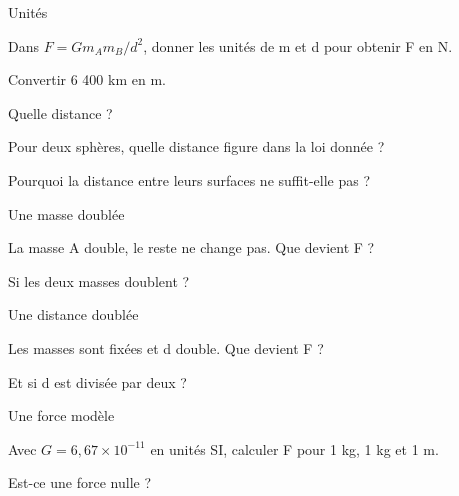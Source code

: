 \par\noindent\begin{minipage}{\linewidth}
\begin{exercice}[1]{Unités}
\begin{questions}
\item Dans $F=Gm_A m_B/d^2$, donner les unités de m et d pour obtenir F en N.
\item Convertir 6 400 km en m.
\end{questions}
\end{exercice}
\end{minipage}
\par\noindent\begin{minipage}{\linewidth}
\begin{exercice}[1]{Quelle distance ?}
\begin{questions}
\item Pour deux sphères, quelle distance figure dans la loi donnée ?
\item Pourquoi la distance entre leurs surfaces ne suffit-elle pas ?
\end{questions}
\end{exercice}
\end{minipage}
\par\noindent\begin{minipage}{\linewidth}
\begin{exercice}[1]{Une masse doublée}
\begin{questions}
\item La masse A double, le reste ne change pas. Que devient F ?
\item Si les deux masses doublent ?
\end{questions}
\end{exercice}
\end{minipage}
\clearpage{}
\par\noindent\begin{minipage}{\linewidth}
\begin{exercice}[2]{Une distance doublée}
\begin{questions}
\item Les masses sont fixées et d double. Que devient F ?
\item Et si d est divisée par deux ?
\end{questions}
\end{exercice}
\end{minipage}
\par\noindent\begin{minipage}{\linewidth}
\begin{exercice}[2]{Une force modèle}
\begin{questions}
\item Avec $G=6{,}67\times10^{-11}$ en unités SI, calculer F pour 1 kg, 1 kg et 1 m.
\item Est-ce une force nulle ?
\end{questions}
\end{exercice}
\end{minipage}
